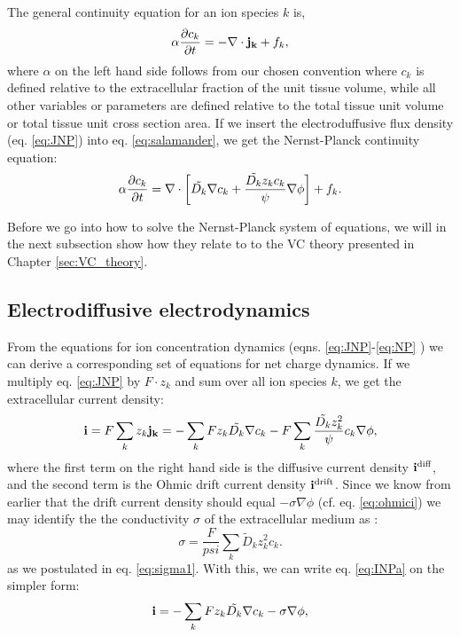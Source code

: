 The general continuity equation for an ion species $k$ is,
\begin{equation}
\alpha \frac{\partial c_k}{\partial t} = - \nabla \cdot {\bf j_k} + f_k,
\label{eq:salamander}
\end{equation}
where $\alpha$ on the left hand side follows from our chosen convention where $c_k$ is defined relative to the extracellular fraction of the unit tissue volume, while all other variables or parameters are defined relative to the total tissue unit volume or total tissue unit cross section area. If we insert the electroduffusive flux density (eq. \ref{eq:JNP}) into eq. \ref{eq:salamander},
we get the Nernst-Planck continuity equation:
\begin{equation}
\alpha \frac{\partial c_k}{\partial t} = {\bf \nabla} \cdot \left[ \tilde{D_k} {\bf \nabla} c_k + \frac{\tilde{D_k} z_k c_k}{\psi} {\bf \nabla} \phi \right] + f_k.
\label{eq:NP}
\end{equation}

Before we go into how to solve the Nernst-Planck system of equations, we will in the next subsection show how they relate to to the VC theory presented in Chapter \ref{sec:VC_theory}.


\subsection{Electrodiffusive electrodynamics}
From the equations for ion concentration dynamics (eqns. \ref{eq:JNP}-\ref{eq:NP} ) we can derive a corresponding set of equations for net charge dynamics. If we multiply eq. \ref{eq:JNP} by $F\cdot z_k$ and sum over all ion species $k$, we get the extracellular current density:
\begin{equation}
{\bf i} = F\sum_k {z_k {\bf j_k}} = -\sum_k{F z_k \tilde{D_k}{\bf \nabla} c_{k}} - F\sum_{k} \frac{\tilde{D_k} z_{k}^2}{\psi}c_{k} {\bf \nabla}{\phi}, 
\label{eq:INPa}
\end{equation}
where the first term on the right hand side is the diffusive current density ${\bf i^\text{diff}}$, and the second term is the Ohmic drift current density ${\bf i^\text{drift}}$. Since we know from earlier that the drift current density should equal $- \sigma \nabla \phi$  (cf. eq. \ref{eq:ohmici}) we may identify the the conductivity $\sigma$ of the extracellular medium as \citep{Koch1999}:
\begin{equation}
\sigma = \frac{F}{psi}\sum_{k} \tilde{D}_k z_{k}^2 c_{k}.
\label{eq:sigma}
\end{equation}
as we postulated in eq. \ref{eq:sigma1}. With this, we can write eq. \ref{eq:INPa} on the simpler form:
\begin{equation}
{\bf i} = - \sum_k{F z_k \tilde{D_k}{\bf \nabla} c_{k}} - \sigma{\bf \nabla}{\phi},
\label{eq:INP}
\end{equation}

